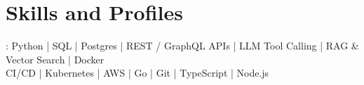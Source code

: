 \documentclass[]{jack-resume}
\begin{document}
\pagecolor{darkmodeBackground}

%
%



%
%
\begin{minipage}[t][1cm][t]{.03\textwidth}
    \hfill
\end{minipage}






\section{Skills and Profiles}
:
Python \hfill | \hfill
SQL \hfill | \hfill
Postgres \hfill | \hfill
REST / GraphQL APIs \hfill | \hfill
LLM Tool Calling \hfill | \hfill
RAG \& Vector Search \hfill | \hfill
Docker \\
\hspace{1.0cm} CI/CD \hfill | \hfill
Kubernetes \hfill | \hfill
AWS \hfill | \hfill
Go \hfill | \hfill
Git \hfill | \hfill
TypeScript \hfill | \hfill
Node.js \\
\end{document}
